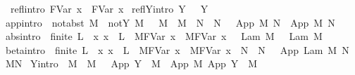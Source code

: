 \begin{isabellebody}
\isanewline
\ \ refl{\isacharbrackleft}intro{\isacharbrackright}{\isacharcolon}\ {\isachardoublequoteopen}{\isacharparenleft}FVar\ x{\isacharparenright}\ {\isachargreater}{\isachargreater}{\isachargreater}\ {\isacharparenleft}FVar\ x{\isacharparenright}{\isachardoublequoteclose}\isanewline
{\isacharbar}\ reflY{\isacharbrackleft}intro{\isacharbrackright}{\isacharcolon}\ {\isachardoublequoteopen}Y\ {\isasymsigma}\ {\isachargreater}{\isachargreater}{\isachargreater}\ Y\ {\isasymsigma}{\isachardoublequoteclose}\isanewline
{\isacharbar}\ app{\isacharbrackleft}intro{\isacharbrackright}{\isacharcolon}\ {\isachardoublequoteopen}{\isasymlbrakk}\ not{\isacharunderscore}abst\ M\ {\isacharsemicolon}\ not{\isacharunderscore}Y\ M\ {\isacharsemicolon}\ \ M\ {\isachargreater}{\isachargreater}{\isachargreater}\ M{\isacharprime}\ {\isacharsemicolon}\ N\ {\isachargreater}{\isachargreater}{\isachargreater}\ N{\isacharprime}\ {\isasymrbrakk}\ {\isasymLongrightarrow}\ App\ M\ N\ {\isachargreater}{\isachargreater}{\isachargreater}\ App\ M{\isacharprime}\ N{\isacharprime}{\isachardoublequoteclose}\isanewline
{\isacharbar}\ abs{\isacharbrackleft}intro{\isacharbrackright}{\isacharcolon}\ {\isachardoublequoteopen}{\isasymlbrakk}\ finite\ L\ {\isacharsemicolon}\ {\isacharparenleft}{\isasymAnd}x{\isachardot}\ x\ {\isasymnotin}\ L\ {\isasymLongrightarrow}\ M{\isacharcircum}{\isacharparenleft}FVar\ x{\isacharparenright}\ {\isachargreater}{\isachargreater}{\isachargreater}\ M{\isacharprime}{\isacharcircum}{\isacharparenleft}FVar\ x{\isacharparenright}{\isacharparenright}\ {\isasymrbrakk}\ {\isasymLongrightarrow}\ Lam\ M\ {\isachargreater}{\isachargreater}{\isachargreater}\ \ Lam\ M{\isacharprime}{\isachardoublequoteclose}\isanewline
{\isacharbar}\ beta{\isacharbrackleft}intro{\isacharbrackright}{\isacharcolon}\ {\isachardoublequoteopen}{\isasymlbrakk}\ finite\ L\ {\isacharsemicolon}\ {\isacharparenleft}{\isasymAnd}x{\isachardot}\ x\ {\isasymnotin}\ L\ {\isasymLongrightarrow}\ M{\isacharcircum}{\isacharparenleft}FVar\ x{\isacharparenright}\ {\isachargreater}{\isachargreater}{\isachargreater}\ M{\isacharprime}{\isacharcircum}{\isacharparenleft}FVar\ x{\isacharparenright}{\isacharparenright}\ {\isacharsemicolon}\ N\ {\isachargreater}{\isachargreater}{\isachargreater}\ N{\isacharprime}\ {\isasymrbrakk}\ {\isasymLongrightarrow}\ App\ {\isacharparenleft}Lam\ M{\isacharparenright}\ N\ {\isachargreater}{\isachargreater}{\isachargreater}\ M{\isacharprime}{\isacharcircum}N{\isacharprime}{\isachardoublequoteclose}\isanewline
{\isacharbar}\ Y{\isacharbrackleft}intro{\isacharbrackright}{\isacharcolon}\ {\isachardoublequoteopen}{\isasymlbrakk}\ M\ {\isachargreater}{\isachargreater}{\isachargreater}\ M{\isacharprime}\ {\isasymrbrakk}\ {\isasymLongrightarrow}\ App\ {\isacharparenleft}Y\ {\isasymsigma}{\isacharparenright}\ M\ {\isachargreater}{\isachargreater}{\isachargreater}\ App\ M{\isacharprime}\ {\isacharparenleft}App\ {\isacharparenleft}Y\ {\isasymsigma}{\isacharparenright}\ M{\isacharprime}{\isacharparenright}{\isachardoublequoteclose}\isanewline

\end{isabellebody}
